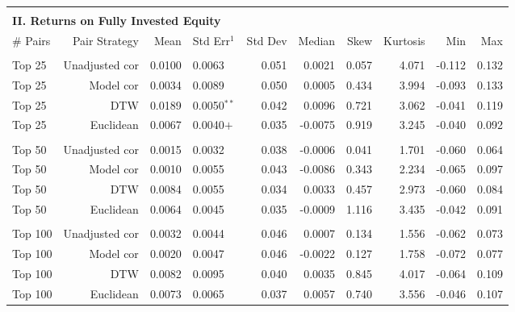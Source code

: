 \documentclass[12pt]{article}
\begin{document}
\begin{table}[hp]
\begin{tabular}{l r r l r r r r r r}
        \vspace{-1mm} \\
        \hline
        \vspace{1 mm} \\
        \multicolumn{9}{l}{\textbf{II. Returns on Fully Invested Equity}} \\
        \# Pairs  & Pair Strategy & Mean & Std Err{$^{1}$} & Std Dev & Median & Skew & Kurtosis & Min & Max \\
        \hline
        \vspace{-1mm} \\
        Top 25    & Unadjusted cor &  0.0100 & 0.0063          & 0.051 &  0.0021 &  0.057 & 4.071 & -0.112 & 0.132 \\
        Top 25    & Model cor      &  0.0034 & 0.0089          & 0.050 &  0.0005 &  0.434 & 3.994 & -0.093 & 0.133 \\
        Top 25    & DTW            &  0.0189 & 0.0050{$^{**}$} & 0.042 &  0.0096 &  0.721 & 3.062 & -0.041 & 0.119 \\
        Top 25    & Euclidean      &  0.0067 & 0.0040{$+$}     & 0.035 & -0.0075 &  0.919 & 3.245 & -0.040 & 0.092 \\
        \vspace{-1mm} \\
        Top 50    & Unadjusted cor &  0.0015 & 0.0032          & 0.038 & -0.0006 &  0.041 & 1.701 & -0.060 & 0.064 \\
        Top 50    & Model cor      &  0.0010 & 0.0055          & 0.043 & -0.0086 &  0.343 & 2.234 & -0.065 & 0.097 \\
        Top 50    & DTW            &  0.0084 & 0.0055          & 0.034 &  0.0033 &  0.457 & 2.973 & -0.060 & 0.084 \\
        Top 50    & Euclidean      &  0.0064 & 0.0045          & 0.035 & -0.0009 &  1.116 & 3.435 & -0.042 & 0.091 \\
        \vspace{-1mm} \\
        Top 100   & Unadjusted cor &  0.0032 & 0.0044          & 0.046 &  0.0007 &  0.134 & 1.556 & -0.062 & 0.073 \\
        Top 100   & Model cor      &  0.0020 & 0.0047          & 0.046 & -0.0022 &  0.127 & 1.758 & -0.072 & 0.077 \\
        Top 100   & DTW            &  0.0082 & 0.0095          & 0.040 &  0.0035 &  0.845 & 4.017 & -0.064 & 0.109 \\
        Top 100   & Euclidean      &  0.0073 & 0.0065          & 0.037 &  0.0057 &  0.740 & 3.556 & -0.046 & 0.107 \\

\end{tabular}
\end{table}
\end{document}
